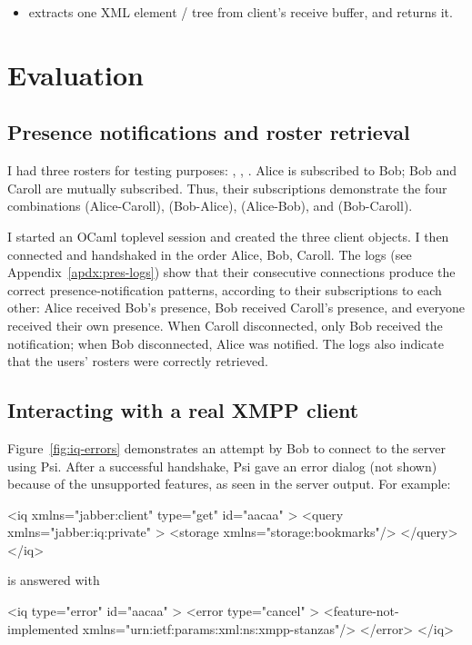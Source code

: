 \documentclass[12pt,a4paper,twoside,openright]{report}
\begin{document}
{\begin{itemize}
  \item {} extracts one XML element / tree from client's receive buffer, and returns it.
\end{itemize}


\chapter{Evaluation}
\section{Presence notifications and roster retrieval}
I had three rosters for testing purposes: , , . Alice is subscribed to Bob; Bob and Caroll are mutually subscribed. Thus, their subscriptions demonstrate the four combinations  (Alice-Caroll),  (Bob-Alice),  (Alice-Bob), and  (Bob-Caroll).

I started an OCaml toplevel session and created the three client objects. I then connected and handshaked in the order Alice, Bob, Caroll.
The logs (see Appendix~\ref{apdx:pres-logs}) show that their consecutive connections produce the correct presence-notification patterns, according to their subscriptions to each other: Alice received Bob's presence, Bob received Caroll's presence, and everyone received their own presence. When Caroll disconnected, only Bob received the notification; when Bob disconnected, Alice was notified. The logs also indicate that the users' rosters were correctly retrieved.

\section{Interacting with a real XMPP client}
Figure~\ref{fig:iq-errors} demonstrates an attempt by Bob to connect to the server using Psi. After a successful handshake, Psi gave an error dialog (not shown) because of the unsupported features, as seen in the server output. For example:

\begin{xml}
<iq xmlns="jabber:client" type="get" id="aacaa" >
  <query xmlns="jabber:iq:private" >
   <storage xmlns="storage:bookmarks"/>
  </query>
</iq>
\end{xml} is answered with
\begin{xml}
<iq type="error" id="aacaa" >
  <error type="cancel" >
    <feature-not-implemented xmlns="urn:ietf:params:xml:ns:xmpp-stanzas"/>
  </error>
</iq>
\end{xml}

}
\end{document}
